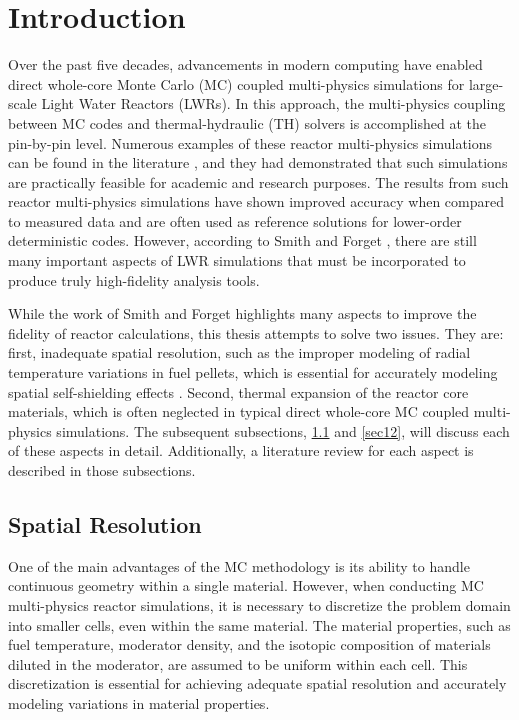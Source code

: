 \section{Introduction} \label{s1}

Over the past five decades, advancements in modern computing have enabled direct whole-core Monte Carlo (MC) coupled multi-physics simulations for large-scale Light Water Reactors (LWRs). In this approach, the multi-physics coupling between MC codes and thermal-hydraulic (TH) solvers is accomplished at the pin-by-pin level. Numerous examples of these reactor multi-physics simulations can be found in the literature \cite{tung_2020,kelly_2017,ma_2019}, and they had demonstrated that such simulations are practically feasible for academic and research purposes. The results from such reactor multi-physics simulations have shown improved accuracy when compared to measured data and are often used as reference solutions for lower-order deterministic codes. However, according to Smith and Forget \cite{smith_2013}, there are still many important aspects of LWR simulations that must be incorporated to produce truly high-fidelity analysis tools.

While the work of Smith and Forget highlights many aspects to improve the fidelity of reactor calculations, this thesis attempts to solve two issues. They are: first, inadequate spatial resolution, such as the improper modeling of radial temperature variations in fuel pellets, which is essential for accurately modeling spatial self-shielding effects \cite{smith_2013, nchoi_2020}. Second, thermal expansion of the reactor core materials, which is often neglected in typical direct whole-core MC coupled multi-physics simulations. The subsequent subsections, \ref{sec11} and \ref{sec12}, will discuss each of these aspects in detail. Additionally, a literature review for each aspect is described in those subsections.

\subsection{Spatial Resolution} \label{sec11}

One of the main advantages of the MC methodology is its ability to handle continuous geometry within a single material. However, when conducting MC multi-physics reactor simulations, it is necessary to discretize the problem domain into smaller cells, even within the same material. The material properties, such as fuel temperature, moderator density, and the isotopic composition of materials diluted in the moderator, are assumed to be uniform within each cell. This discretization is essential for achieving adequate spatial resolution and accurately modeling variations in material properties.

